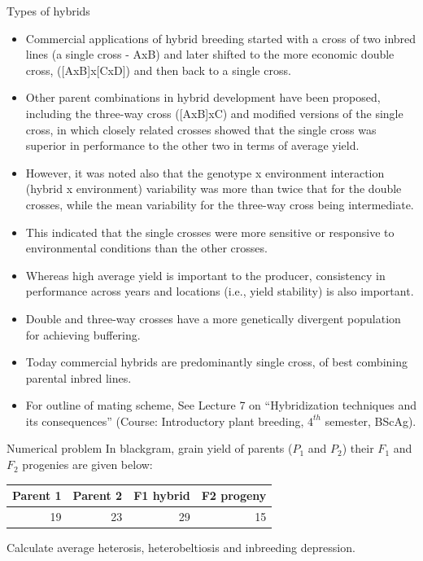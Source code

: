 \documentclass[11pt,dvipsnames,ignorenonframetext,aspectratio=169]{beamer}
\providecommand{\tightlist}{%
  \setlength{\itemsep}{0pt}\setlength{\parskip}{0pt}}
\begin{document}
\begin{frame}{Types of hybrids}
\protect\hypertarget{types-of-hybrids}{}
\begin{itemize}
\tightlist
\item
  Commercial applications of hybrid breeding started with a cross of two
  inbred lines (a single cross - AxB) and later shifted to the more
  economic double cross, ({[}AxB{]}x{[}CxD{]}) and then back to a single
  cross.
\item
  Other parent combinations in hybrid development have been proposed,
  including the three-way cross ({[}AxB{]}xC) and modified versions of
  the single cross, in which closely related crosses showed that the
  single cross was superior in performance to the other two in terms of
  average yield.
\item
  However, it was noted also that the genotype x environment interaction
  (hybrid x environment) variability was more than twice that for the
  double crosses, while the mean variability for the three-way cross
  being intermediate.
\end{itemize}
\end{frame}

\begin{frame}{}
\protect\hypertarget{section-5}{}
\begin{itemize}
\tightlist
\item
  This indicated that the single crosses were more sensitive or
  responsive to environmental conditions than the other crosses.
\item
  Whereas high average yield is important to the producer, consistency
  in performance across years and locations (i.e., yield stability) is
  also important.
\item
  Double and three-way crosses have a more genetically divergent
  population for achieving buffering.
\item
  Today commercial hybrids are predominantly single cross, of best
  combining parental inbred lines.
\item
  For outline of mating scheme, See Lecture 7 on ``Hybridization
  techniques and its consequences'' (Course: Introductory plant
  breeding, \(4^{th}\) semester, BScAg).
\end{itemize}
\end{frame}

\begin{frame}{Numerical problem}
\protect\hypertarget{numerical-problem}{}
In blackgram, grain yield of parents (\(P_1\) and \(P_2\)) their \(F_1\)
and \(F_2\) progenies are given below:

\begin{table}
\centering\begingroup\fontsize{6}{8}\selectfont

\begin{tabular}{rrrr}
\toprule
Parent 1 & Parent 2 & F1 hybrid & F2 progeny\\
\midrule
19 & 23 & 29 & 15\\
\bottomrule
\end{tabular}
\endgroup{}
\end{table}

Calculate average heterosis, heterobeltiosis and inbreeding depression.
\end{frame}
\end{document}
